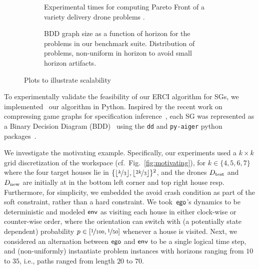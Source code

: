 \begin{figure*}
    \begin{subfigure}{0.47\textwidth}
  \centering
  \scalebox{0.50}{
    
    }
    \caption{
      Experimental times for computing Pareto Front of a variety
      delivery drone problems
      \label{fig:exp_times}.
    }
  \end{subfigure}
  \hfill
    \begin{subfigure}{0.47\textwidth}
    \centering \scalebox{0.53}{
      
    }
    \caption{
      BDD graph size as a function of horizon for the problems in our
      benchmark suite. Distribution of problems, non-uniform in horizon
      to avoid small horizon artifacts\label{fig:bdd_sizes}.
    }
  \end{subfigure}
  \caption{Plots to illustrate scalability} 
\end{figure*}

 To experimentally validate the feasibility of our ERCI
algorithm for SGs, we implemented~\cite{RSS21code} our algorithm in
Python.  Inspired by the recent work on compressing
game graphs for specification
inference~\cite{DBLP:conf/cav/Vazquez-Chanlatte20}, each SG was
represented as a Binary Decision Diagram
(BDD)~\cite{DBLP:journals/csur/Bryant92} using the \texttt{dd} and
\texttt{py-aiger} python packages~\cite{dd, pyAiger}.

We investigate the motivating example.
Specifically, our experiments used
a $k\times k$ grid discretization of the workspace (cf.\ Fig.~\ref{fig:motivating}), for $k \in
\{4,5,6,7\}$ where the four target houses lie in
$\{\lfloor\nicefrac{k}{3}\rfloor, \lfloor\nicefrac{2k}{3}\rfloor
\}^2$, and the drones ${D_{\text{test}}}$ and ${D_{\text{new}}}$ are initially at in the bottom left corner and top right house resp. Furthermore, for simplicity, we embedded the avoid crash
condition as part of the soft constraint, rather than a hard
constraint\footnotemark. We took~$\mathsf{ego}$'s dynamics to be deterministic
and modeled $\mathsf{env}$ as visiting each house in either clock-wise or
counter-wise order, where the orientation can switch with
(a potentially state dependent) probability $p \in [\nicefrac{1}{100},
\nicefrac{1}{50}]$ whenever a house is visited. Next, we considered an
alternation between $\mathsf{ego}$ and $\mathsf{env}$ to be a single logical time
step, and (non-uniformly) instantiate problem instances with horizons
ranging from $10$ to $35$, i.e., paths ranged from length $20$ to
$70$.



